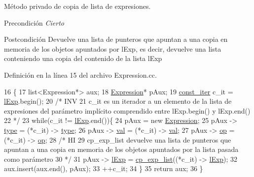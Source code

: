 Método privado de copia de lista de expresiones. 

\begin{DoxyPrecond}{Precondición}
{\itshape Cierto} 
\end{DoxyPrecond}
\begin{DoxyPostcond}{Postcondición}
Devuelve una lista de punteros que apuntan a una copia en memoria de los objetos apuntados por \textquotesingle{}l\+Exp\textquotesingle{}, es decir, devuelve una lista conteniendo una copia del contenido de la lista \textquotesingle{}l\+Exp\textquotesingle{} 
\end{DoxyPostcond}


Definición en la línea 15 del archivo Expression.\+cc.


\begin{DoxyCode}
16 \{
17   list<Expression*> aux;
18   \hyperlink{class_expression}{Expression}* pAux;
19   \hyperlink{_expression_8cc_a6ff59711533978050143f1bfb54c33b1}{const\_iter} c\_it = \hyperlink{class_expression_afb4f4617291f7e182cbf2252151b122a}{lExp}.begin();
20   \textcolor{comment}{/* INV}
21 \textcolor{comment}{    c\_it es un iterador a un elemento de la lista de expresiones del parámetro implícito comprendido entre
       lExp.begin() y lExp.end()}
22 \textcolor{comment}{  */}
23   \textcolor{keywordflow}{while}(c\_it != \hyperlink{class_expression_afb4f4617291f7e182cbf2252151b122a}{lExp}.end())\{
24     pAux = \textcolor{keyword}{new} \hyperlink{class_expression_afcf87716bf0abfe8d414c92529e1564a}{Expression};
25     pAux -> \hyperlink{class_expression_a2c094b93c4863b1f851ea2136aae9612}{type} = (*c\_it) -> \hyperlink{class_expression_a2c094b93c4863b1f851ea2136aae9612}{type};
26     pAux -> \hyperlink{class_expression_a9c15b529b5d59e6bffb3855e384c04aa}{val} = (*c\_it) -> \hyperlink{class_expression_a9c15b529b5d59e6bffb3855e384c04aa}{val};
27     pAux -> \hyperlink{class_expression_a30856695b46075ada151f6f6cdfb9fa8}{op} = (*c\_it) -> \hyperlink{class_expression_a30856695b46075ada151f6f6cdfb9fa8}{op};
28     \textcolor{comment}{/* HI}
29 \textcolor{comment}{      cp\_exp\_list devuelve una lista de punteros que apuntan a una copia en memoria de los objetos
       apuntados por la lista pasada como parámetro}
30 \textcolor{comment}{    */}
31     pAux -> \hyperlink{class_expression_afb4f4617291f7e182cbf2252151b122a}{lExp} = \hyperlink{class_expression_a0d7df919d94bc861a5fe5be4be2dc836}{cp\_exp\_list}((*c\_it) -> \hyperlink{class_expression_afb4f4617291f7e182cbf2252151b122a}{lExp});
32     aux.insert(aux.end(), pAux);
33     ++c\_it;
34   \}
35   \textcolor{keywordflow}{return} aux;
36 \}
\end{DoxyCode}
